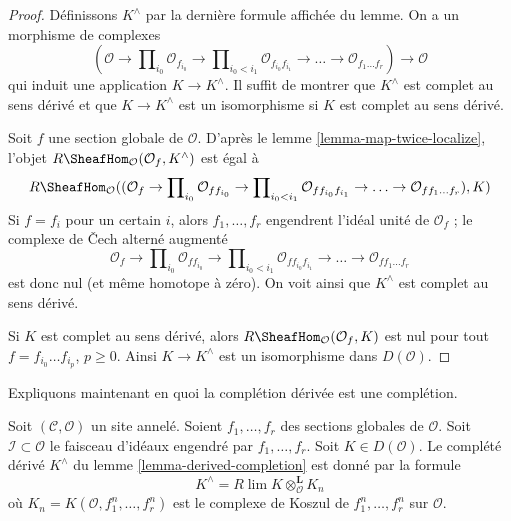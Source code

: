 \begin{proof}
Définissons $K^\wedge$ par la dernière formule affichée du lemme.
On a un morphisme de complexes
$$
(\mathcal{O} \to \prod\nolimits_{i_0} \mathcal{O}_{f_{i_0}} \to
\prod\nolimits_{i_0 < i_1} \mathcal{O}_{f_{i_0}f_{i_1}} \to
\ldots \to \mathcal{O}_{f_1\ldots f_r}) \longrightarrow \mathcal{O}
$$
qui induit une application $K \to K^\wedge$. Il suffit de montrer que
$K^\wedge$ est complet au sens dérivé et que $K \to K^\wedge$ est un
isomorphisme si $K$ est complet au sens dérivé.

\medskip\noindent
Soit $f$ une section globale de $\mathcal{O}$.
D'après le lemme \ref{lemma-map-twice-localize}, l'objet
$R\SheafHom_\mathcal{O}(\mathcal{O}_f, K^\wedge)$
est égal à
$$
R\SheafHom_\mathcal{O}(
(\mathcal{O}_f \to \prod\nolimits_{i_0} \mathcal{O}_{ff_{i_0}} \to
\prod\nolimits_{i_0 < i_1} \mathcal{O}_{ff_{i_0}f_{i_1}} \to
\ldots \to \mathcal{O}_{ff_1\ldots f_r}), K)
$$
Si $f = f_i$ pour un certain $i$, alors $f_1, \ldots, f_r$ engendrent
l'idéal unité de $\mathcal{O}_f$ ; le complexe de
{\v C}ech alterné augmenté
$$
\mathcal{O}_f \to \prod\nolimits_{i_0} \mathcal{O}_{ff_{i_0}} \to
\prod\nolimits_{i_0 < i_1} \mathcal{O}_{ff_{i_0}f_{i_1}} \to
\ldots \to \mathcal{O}_{ff_1\ldots f_r}
$$
est donc nul (et même homotope à zéro). On voit ainsi que $K^\wedge$
est complet au sens dérivé.

\medskip\noindent
Si $K$ est complet au sens dérivé, alors $R\SheafHom_\mathcal{O}(\mathcal{O}_f, K)$
est nul pour tout $f = f_{i_0} \ldots f_{i_p}$, $p \geq 0$. Ainsi
$K \to K^\wedge$ est un isomorphisme dans $D(\mathcal{O})$.
\end{proof}

\noindent
Expliquons maintenant en quoi la complétion dérivée est une complétion.

\begin{lemma}
\label{lemma-derived-completion-koszul}
Soit $(\mathcal{C}, \mathcal{O})$ un site annelé. Soient $f_1, \ldots, f_r$
des sections globales de $\mathcal{O}$. Soit $\mathcal{I} \subset \mathcal{O}$
le faisceau d'idéaux engendré par $f_1, \ldots, f_r$. Soit $K \in D(\mathcal{O})$.
Le complété dérivé $K^\wedge$ du lemme \ref{lemma-derived-completion}
est donné par la formule
$$
K^\wedge = R\lim K \otimes^\mathbf{L}_\mathcal{O} K_n
$$
où $K_n = K(\mathcal{O}, f_1^n, \ldots, f_r^n)$
est le complexe de Koszul de $f_1^n, \ldots, f_r^n$ sur $\mathcal{O}$.
\end{lemma}

